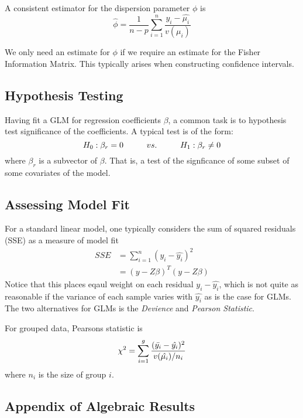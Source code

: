 \begin{lemma}
    A consistent estimator for the dispersion parameter $\phi$ is 
    $$\hat{\phi} = \frac{1}{n-p}\sum_{i=1}^{n}\frac{y_i - \hat{\mu_i}}{v(\mu_i)}$$
\end{lemma}
\begin{note}
    We only need an estimate for $\phi$ if we require an estimate for the Fisher Information Matrix. This typically arises when constructing confidence intervals.
\end{note}

\subsection{Hypothesis Testing}
Having fit a GLM for regression coefficients $\beta$, a common task is to hypothesis test significance of the coefficients. A typical test is of the form: 
$$H_0: \beta_r = 0 \hspace{10mm} vs. \hspace{10mm} H_1: \beta_r \neq 0$$
where $\beta_r$ is a subvector of $\beta$. That is, a test of the signficance of some subset of some covariates of the model.

\subsection{Assessing Model Fit}
For a standard linear model, one typically considers the sum of squared residuals (SSE) as a measure of model fit
\begin{align*}
    SSE &= \sum_{i=1}^{n}(y_i - \hat{y_i})^2 \\
    &= (y - Z\beta)^T(y-Z\beta)
\end{align*}
Notice that this places eqaul weight on each residual $y_i - 
\hat{y_i}$, which is not quite as reasonable if the variance of each sample varies with $\hat{y_i}$ as is the case for GLMs. The two alternatives for GLMs is the \textit{Devience} and \textit{Pearson Statistic}.

\begin{definition}
    For grouped data, Pearsons statistic is 
    $$\chi^2 = \sum_{i=1}^{g}\frac{(\Bar{y_i} - \hat{y_i})^2}{v(\hat{\mu_i})/n_i}$$
    where $n_i$ is the size of group $i$.
\end{definition}

\subsection{Appendix of Algebraic Results}
